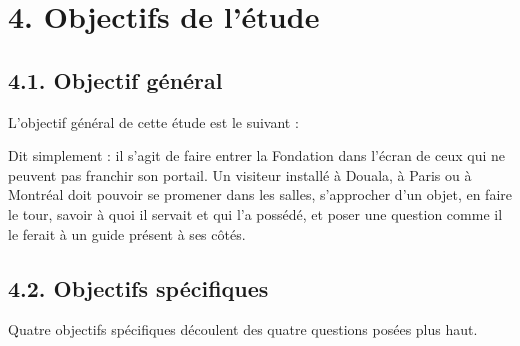 \section*{4. Objectifs de l'étude}

\subsection*{4.1. Objectif général}

L'objectif général de cette étude est le suivant :


Dit simplement : il s'agit de faire entrer la Fondation dans l'écran de ceux qui
ne peuvent pas franchir son portail. Un visiteur installé à Douala, à Paris ou à
Montréal doit pouvoir se promener dans les salles, s'approcher d'un objet, en
faire le tour, savoir à quoi il servait et qui l'a possédé, et poser une
question comme il le ferait à un guide présent à ses côtés.

\subsection*{4.2. Objectifs spécifiques}

Quatre objectifs spécifiques découlent des quatre questions posées plus haut.

